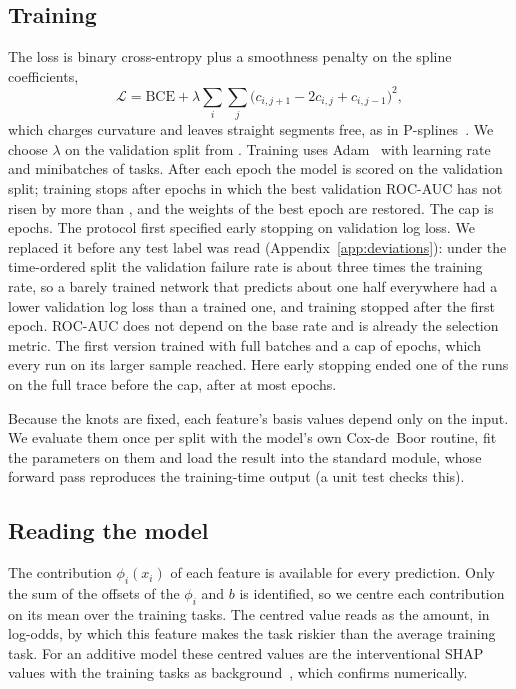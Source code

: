 \subsection{Training}
The loss is binary cross-entropy plus a smoothness penalty on the spline coefficients,
\begin{equation}
\mathcal{L}=\mathrm{BCE}+\lambda\sum_{i}\sum_{j}\big(c_{i,j+1}-2c_{i,j}+c_{i,j-1}\big)^2,
\end{equation}
which charges curvature and leaves straight segments free, as in P-splines~\cite{eilers1996psplines}. We choose $\lambda$ on the validation split from . Training uses Adam~\cite{kingma2015adam} with learning rate  and minibatches of  tasks. After each epoch the model is scored on the validation split; training stops after  epochs in which the best validation ROC-AUC has not risen by more than , and the weights of the best epoch are restored. The cap is  epochs. The protocol first specified early stopping on validation log loss. We replaced it before any test label was read (Appendix~\ref{app:deviations}): under the time-ordered split the validation failure rate is about three times the training rate, so a barely trained network that predicts about one half everywhere had a lower validation log loss than a trained one, and training stopped after the first epoch. ROC-AUC does not depend on the base rate and is already the selection metric. The first version trained with full batches and a cap of  epochs, which every run on its larger sample reached. Here early stopping ended  one of the  \kaam{} runs on the full trace before the cap, after at most  epochs.

Because the knots are fixed, each feature's basis values depend only on the input. We evaluate them once per split with the model's own Cox-de~Boor routine, fit the parameters on them and load the result into the standard module, whose forward pass reproduces the training-time output (a unit test checks this).

\subsection{Reading the model}
The contribution $\phi_i(x_i)$ of each feature is available for every prediction. Only the sum of the offsets of the $\phi_i$ and $b$ is identified, so we centre each contribution on its mean over the training tasks. The centred value reads as the amount, in log-odds, by which this feature makes the task riskier than the average training task. For an additive model these centred values are the interventional SHAP values with the training tasks as background~\cite{lundberg2017shap}, which  confirms numerically.

